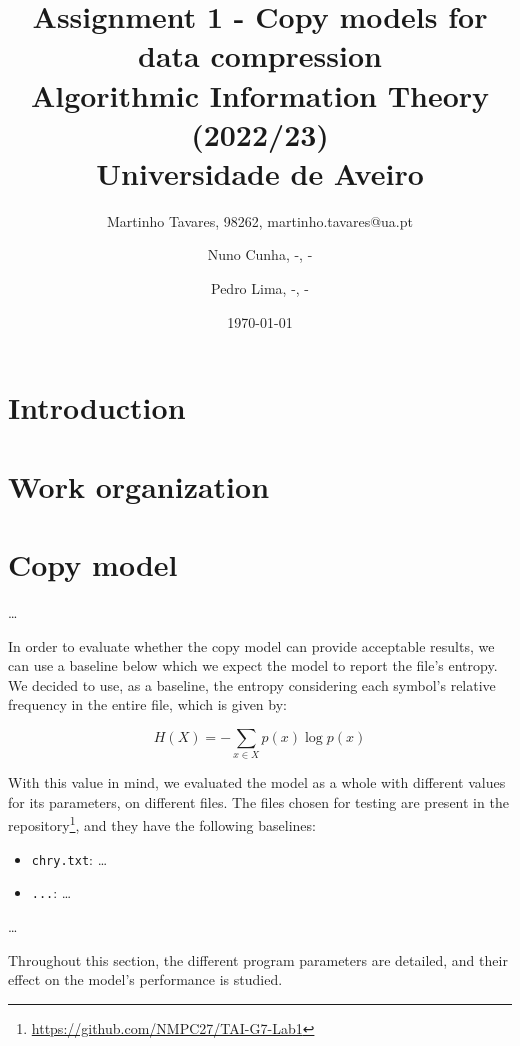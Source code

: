 \documentclass{article}
\begin{document}
\title{
    Assignment 1 - Copy models for data compression \\
    \large{Algorithmic Information Theory (2022/23) \\
    Universidade de Aveiro}
}

\author{
    Martinho Tavares, 98262, martinho.tavares@ua.pt \and
    Nuno Cunha, -, - \and
    Pedro Lima, -, -
}

\date{\today}
\maketitle

\nocite{*}

\section{Introduction}

\section{Work organization}

\section{Copy model}

\dots

In order to evaluate whether the copy model can provide acceptable results, we can use a baseline below which we expect the model to report the file's entropy.
We decided to use, as a baseline, the entropy considering each symbol's relative frequency in the entire file, which is given by:

$$
H(X) = - \sum_{x \in X}{p(x) \log{p(x)}}
$$

With this value in mind, we evaluated the model as a whole with different values for its parameters, on different files.
The files chosen for testing are present in the repository\footnote{\url{https://github.com/NMPC27/TAI-G7-Lab1}}, and they have the following baselines:
\begin{itemize}
    \item \verb|chry.txt|: \dots
    \item \verb|...|: \dots
\end{itemize}

\dots

Throughout this section, the different program parameters are detailed, 
and their effect on the model's performance is studied.
\end{document}
